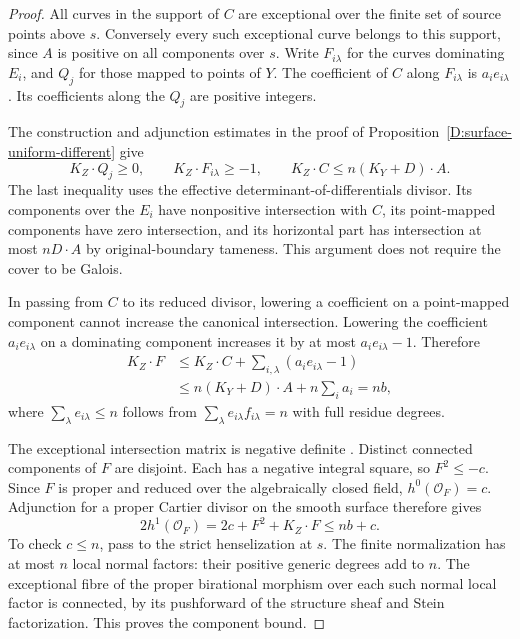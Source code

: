 \begin{proof}
All curves in the support of $C$ are exceptional over the finite
set of source points above $s$. Conversely every such exceptional
curve belongs to this support, since $A$ is positive on all
components over $s$. Write $F_{i\lambda}$ for the curves
dominating $E_i$, and $Q_j$ for those mapped to points of $Y$.
The coefficient of $C$ along $F_{i\lambda}$ is
$a_i e_{i\lambda}$. Its coefficients along the $Q_j$ are
positive integers.

The construction and adjunction estimates in the proof of
Proposition~\ref{D:surface-uniform-different} give
\[
 K_Z\cdot Q_j\ge0,\qquad K_Z\cdot F_{i\lambda}\ge-1,
 \qquad K_Z\cdot C\le n(K_Y+D)\cdot A.                 \tag{D.AG.4}
\]
The last inequality uses the effective determinant-of-differentials
divisor. Its components over the $E_i$ have nonpositive
intersection with $C$, its point-mapped components have zero
intersection, and its horizontal part has intersection at most
$nD\cdot A$ by original-boundary tameness. This argument does
not require the cover to be Galois.

In passing from $C$ to its reduced divisor, lowering a coefficient
on a point-mapped component cannot increase the canonical
intersection. Lowering the coefficient $a_i e_{i\lambda}$ on a
dominating component increases it by at most
$a_i e_{i\lambda}-1$. Therefore
\[
 \begin{split}
 K_Z\cdot F
 &\le K_Z\cdot C+
                \sum_{i,\lambda}(a_i e_{i\lambda}-1)\\
 &\le n(K_Y+D)\cdot A+n\sum_i a_i=nb,
 \end{split}                                          \tag{D.AG.5}
\]
where $\sum_\lambda e_{i\lambda}\le n$ follows from
$\sum_\lambda e_{i\lambda}f_{i\lambda}=n$ with full residue
degrees.

The exceptional intersection matrix is negative definite
\citep[Theorem~10.1]{Kollar2013D}. Distinct connected components
of $F$ are disjoint. Each has a negative integral square,
so $F^2\le-c$. Since $F$ is proper and reduced over the
algebraically closed field, $h^0(\mathcal O_F)=c$.
Adjunction for a proper Cartier divisor on the smooth surface
therefore gives
\[
 2h^1(\mathcal O_F)
   =2c+F^2+K_Z\cdot F\le nb+c.
\]
To check $c\le n$, pass to the strict henselization at $s$.
The finite normalization has at most $n$ local normal factors:
their positive generic degrees add to $n$. The exceptional
fibre of the proper birational morphism over each such normal
local factor is connected, by its pushforward of the structure
sheaf and Stein factorization. This proves the component bound.


\end{proof}
